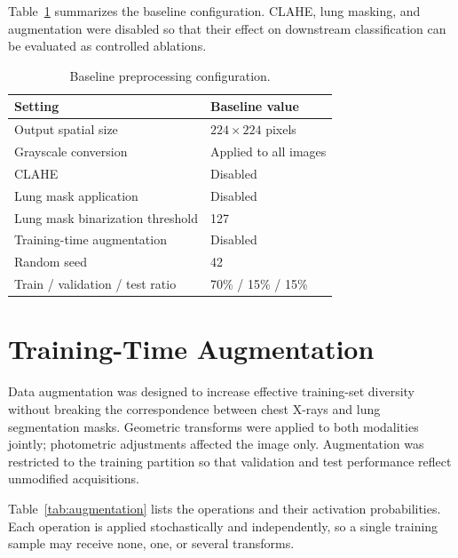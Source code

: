 Table~\ref{tab:preprocess_defaults} summarizes the baseline configuration.
CLAHE, lung masking, and augmentation were disabled so that their effect on
downstream classification can be evaluated as controlled ablations.

\begin{table}[H]
\centering
\caption{Baseline preprocessing configuration.}
\label{tab:preprocess_defaults}
\begin{tabular}{ll}
\toprule
\textbf{Setting} & \textbf{Baseline value} \\
\midrule
Output spatial size & $224 \times 224$ pixels \\
Grayscale conversion & Applied to all images \\
CLAHE & Disabled \\
Lung mask application & Disabled \\
Lung mask binarization threshold & 127 \\
Training-time augmentation & Disabled \\
Random seed & 42 \\
Train / validation / test ratio & 70\% / 15\% / 15\% \\
\bottomrule
\end{tabular}
\end{table}

\section{Training-Time Augmentation}
\label{sec:augmentation}

Data augmentation was designed to increase effective training-set diversity
without breaking the correspondence between chest X-rays and lung segmentation
masks. Geometric transforms were applied to both modalities jointly; photometric
adjustments affected the image only. Augmentation was restricted to the training
partition so that validation and test performance reflect unmodified acquisitions.

Table~\ref{tab:augmentation} lists the operations and their activation probabilities.
Each operation is applied stochastically and independently, so a single training
sample may receive none, one, or several transforms.

